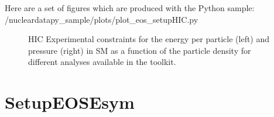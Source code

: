 \documentclass[letterpaper,10pt,english]{sphinxmanual}
\begin{document}
\sphinxAtStartPar
Here are a set of figures which are produced with the Python sample: /nucleardatapy\_sample/plots/plot\_eos\_setupHIC.py

\begin{figure}[htbp]
\centering
\capstart

\noindent{}
\caption{HIC Experimental constraints for the energy per particle (left) and pressure (right) in SM as a function of the particle density for different analyses available in the  toolkit.}\label{\detokenize{source/api/setup_eos_hic:id1}}\end{figure}

\sphinxstepscope


\section{SetupEOSEsym}
\label{\detokenize{source/api/setup_eos_esym:setupeosesym}}\label{\detokenize{source/api/setup_eos_esym::doc}}\label{\detokenize{source/api/setup_eos_esym:module-nucleardatapy.eos.setup_esym}}
\end{document}
